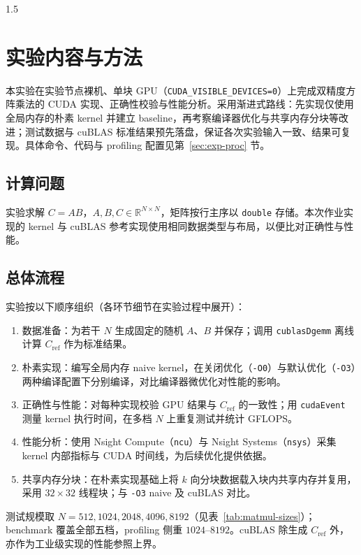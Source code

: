 \documentclass[zihao=-4]{ctexart}
\begin{document}
\begin{spacing}{1.5}
\section{实验内容与方法}

本实验在实验节点裸机、单块 GPU（\protect\texttt{CUDA\_VISIBLE\_DEVICES=0}）上完成双精度方阵乘法的 CUDA 实现、正确性校验与性能分析。采用渐进式路线：先实现仅使用全局内存的朴素 kernel 并建立 baseline，再考察编译器优化与共享内存分块等改进；测试数据与 cuBLAS 标准结果预先落盘，保证各次实验输入一致、结果可复现。具体命令、代码与 profiling 配置见第~\ref{sec:exp-proc} 节。

\subsection{计算问题}

实验求解 $C=AB$，$A,B,C\in\mathbb{R}^{N\times N}$，矩阵按行主序以 \protect\texttt{double} 存储。本次作业实现的 kernel 与 cuBLAS 参考实现使用相同数据类型与布局，以便比对正确性与性能。

\subsection{总体流程}

实验按以下顺序组织（各环节细节在实验过程中展开）：

\begin{enumerate}
  \item 数据准备：为若干 $N$ 生成固定的随机 $A$、$B$ 并保存；调用 \protect\texttt{cublasDgemm} 离线计算 $C_{\mathrm{ref}}$ 作为标准结果。
  \item 朴素实现：编写全局内存 naive kernel，在关闭优化（\protect\texttt{-O0}）与默认优化（\protect\texttt{-O3}）两种编译配置下分别编译，对比编译器微优化对性能的影响。
  \item 正确性与性能：对每种实现校验 GPU 结果与 $C_{\mathrm{ref}}$ 的一致性；用 \protect\texttt{cudaEvent} 测量 kernel 执行时间，在多档 $N$ 上重复测试并统计 GFLOPS。
  \item 性能分析：使用 Nsight Compute（\protect\texttt{ncu}）与 Nsight Systems（\protect\texttt{nsys}）采集 kernel 内部指标与 CUDA 时间线，为后续优化提供依据。
  \item 共享内存分块：在朴素实现基础上将 $k$ 向分块数据载入块内共享内存并复用，采用 $32\times32$ 线程块；与 \protect\texttt{-O3} naive 及 cuBLAS 对比。
\end{enumerate}

测试规模取 $N=512,1024,2048,4096,8192$（见表~\ref{tab:matmul-sizes}）；benchmark 覆盖全部五档，profiling 侧重 $1024$--$8192$。cuBLAS 除生成 $C_{\mathrm{ref}}$ 外，亦作为工业级实现的性能参照上界。


\end{spacing}
\end{document}
